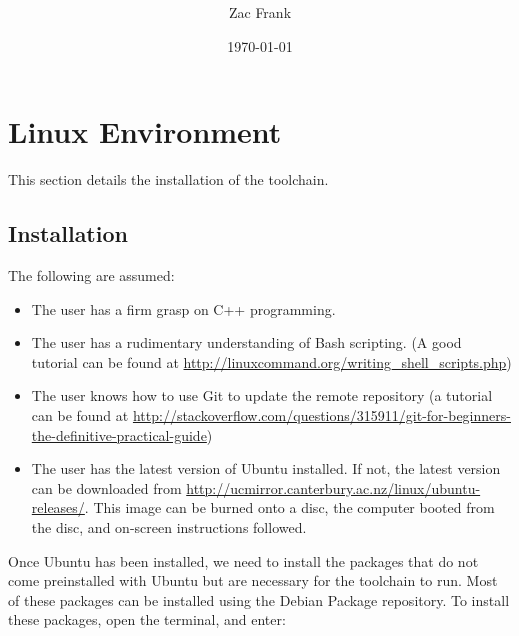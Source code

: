 \documentclass[a4paper, oneside, 11pt, titlepage, onecolumn, openright]{report}
\title{\projecttitle \\ \documenttitle}
\author{Zac Frank}
\date{\today}
\begin{document}
	\maketitle
	
	\clearpage
	\tableofcontents

	


	\clearpage

\chapter{Linux Environment}
		\label{C:Environment}

		This section details the installation of the toolchain.
		\section{Installation }
			\label{s:Installation}
			The following are assumed:
			
\begin{itemize}
			\label{Requirements}
\item The user has a firm grasp on C++ programming.

\item The user has a rudimentary understanding of Bash scripting. (A good tutorial can be found at \url{http://linuxcommand.org/writing\_shell\_scripts.php})

\item The user knows how to use Git to update the remote repository (a tutorial can be found at \url{http://stackoverflow.com/questions/315911/git-for-beginners-the-definitive-practical-guide})

\item The user has the latest version of Ubuntu installed. If not, the latest version can be downloaded from \url{http://ucmirror.canterbury.ac.nz/linux/ubuntu-releases/}. This image can be burned onto a disc, the computer booted from the disc, and on-screen instructions followed.

\end{itemize}
			Once Ubuntu has been installed, we need to install the packages that do not come preinstalled with Ubuntu but are necessary for the toolchain to run. Most of these packages can be installed using the Debian Package repository. To install these packages, open the terminal, and enter:
			
\end{document}
